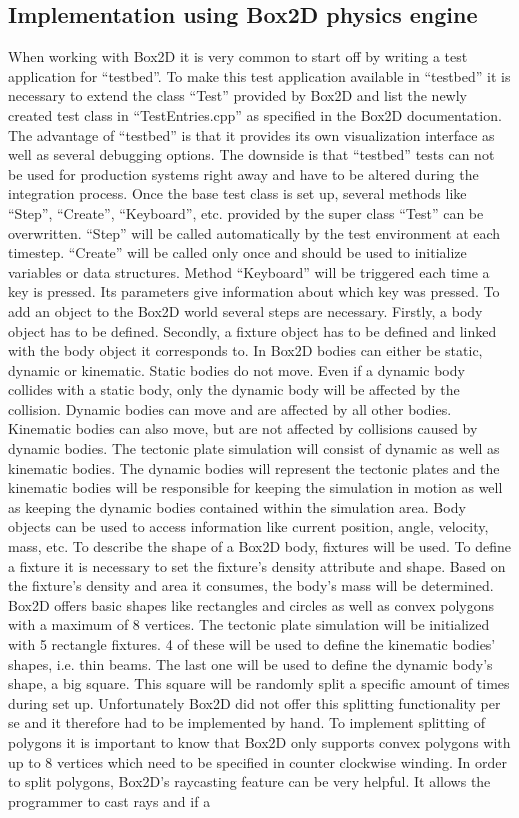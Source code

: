 \documentclass[11pt,a4paper,twoside,openright]{report}
\begin{document}
\subsection{Implementation using Box2D physics engine}
When working with Box2D it is very common to start off by writing a test application for ``testbed''. To make this test application available in ``testbed'' it is necessary to extend the class ``Test'' provided by Box2D and list the newly created test class in ``TestEntries.cpp'' as specified in the Box2D documentation. The advantage of ``testbed'' is that it provides its own visualization interface as well as several debugging options. The downside is that ``testbed'' tests can not be used for production systems right away and have to be altered during the integration process.
Once the base test class is set up, several methods like ``Step'', ``Create'', ``Keyboard'', etc. provided by the super class ``Test'' can be overwritten. ``Step'' will be called automatically by the test environment at each timestep. ``Create'' will be called only once and should be used to initialize variables or data structures. Method ``Keyboard'' will be triggered each time a key is pressed. Its parameters give information about which key was pressed. To add an object to the Box2D world several steps are necessary. Firstly, a body object has to be defined. Secondly, a fixture object has to be defined and linked with the body object it corresponds to. In Box2D bodies can either be static, dynamic or kinematic. Static bodies do not move. Even if a dynamic body collides with a static body, only the dynamic body will be affected by the collision. Dynamic bodies can move and are affected by all other bodies. Kinematic bodies can also move, but are not affected by collisions caused by dynamic bodies. The tectonic plate simulation will consist of dynamic as well as kinematic bodies. The dynamic bodies will represent the tectonic plates and the kinematic bodies will be responsible for keeping the simulation in motion as well as keeping the dynamic bodies contained within the simulation area. Body objects can be used to access information like current position, angle, velocity, mass, etc. To describe the shape of a Box2D body, fixtures will be used. To define a fixture it is necessary to set the fixture's density attribute and shape. Based on the fixture's density and area it consumes, the body's mass will be determined. Box2D offers basic shapes like rectangles and circles as well as convex polygons with a maximum of 8 vertices. The tectonic plate simulation will be initialized with 5 rectangle fixtures. 4 of these will be used to define the kinematic bodies' shapes, i.e. thin beams. The last one will be used to define the dynamic body's shape, a big square. This square will be randomly split a specific amount of times during set up. Unfortunately Box2D did not offer this splitting functionality per se and it therefore had to be implemented by hand. To implement splitting of polygons it is important to know that Box2D only supports convex polygons with up to 8 vertices which need to be specified in counter clockwise winding. In order to split polygons, Box2D's raycasting feature can be very helpful. It allows the programmer to cast rays and if a 
\end{document}
